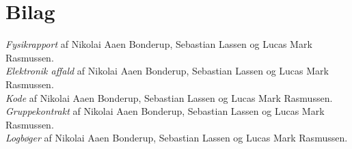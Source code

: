 \section{Bilag}
\emph{Fysikrapport} af Nikolai Aaen Bonderup, Sebastian Lassen og Lucas Mark Rasmussen.\\[0.5cm]


\emph{Elektronik affald} af Nikolai Aaen Bonderup, Sebastian Lassen og Lucas Mark Rasmussen.\\[0.5cm]



\emph{Kode} af Nikolai Aaen Bonderup, Sebastian Lassen og Lucas Mark Rasmussen.\\[0.5cm]


\emph{Gruppekontrakt} af Nikolai Aaen Bonderup, Sebastian Lassen og Lucas Mark Rasmussen.\\[0.5cm]


\emph{Logbøger} af Nikolai Aaen Bonderup, Sebastian Lassen og Lucas Mark Rasmussen.\\[0.5cm]




\newpage

